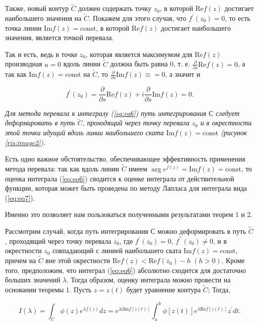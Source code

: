 \documentclass[14pt, a4paper]{article}
\numberwithin{figure}{section}
\numberwithin{equation}{section}
\renewcommand{\Re}{\mathrm{Re}}
\renewcommand{\Im}{\mathrm{Im}}
\newcommand{\const}{\mathrm{const}}
\begin{document}
Также, новый контур $\widetilde{C}$ должен содержать точку $z_0$, в которой $\Re f(z)$ достигает наибольшего значения на $\widetilde{C}$. Покажем для этого случая, что $f^\prime (z_0) = 0$, то есть точка линии $\Im f(z) = \const$, в которой $\Re f (z)$ достигает наибольшего значения, является точкой перевала.

Так и есть, ведь в точке $z_0$, которая является максимумом для $\Re f (z)$ производная $u=0$ вдоль линии $\widetilde{C}$ должна быть равна 0, т. е. $\frac{\partial}{\partial s}\Re f(z)=0$, а так как $\Im f(z) = \const$ на $\widetilde{C}$, то $\frac{\partial}{\partial s} \Im f(z) \equiv = 0$, а значит и 

$$
f^\prime(z_0) = \frac{\partial}{\partial s} \Re f(z) + i\frac{\partial}{\partial s} \Im f(z) = 0.
$$ 

\textit{Для метода перевала к интегралу (\ref{eq:eq6}) путь интегрирования $С$ следует деформировать в путь $\widetilde{C}$, проходящий через точку перевала $z_0$ и в окрестности этой точки идущий вдоль линии наибольшего ската $\Im f(z) = \const$ (рисунок \ref{ris:image2}).}

Есть одно важное обстоятельство, обеспечивающее эффективность применения метода перевала: так как вдоль линии $\widetilde{C}$ имеем $\arg e^{f(z)} = \Im f(z) = \const$, то оценка интеграла (\ref{eq:eq6}) сводится к оценке интеграла от действительной функции, которая может быть проведена по методу Лапласа для интеграла вида (\ref{eq:eq7}).  \cite{Fedoryuk}

Именно это позволяет нам пользоваться полученными результатами теорем 1 и 2. 

Рассмотрим  случай, когда путь интегрирования $С$ можно деформировать в путь $\widetilde{C}$, проходящий через точку перевала $z_0$, где $f^\prime(z_0) = 0$, $f^{\prime\prime}(z_0)\neq0$, и в окрестности $z_0$ совпадающий с линией наибольшего ската $\Im f(z) = \const$, причем на $\widetilde{C}$ вне этой окрестности $\Re f(z) < \Re f(z_0) - h \;(h> 0)$. Кроме того, предположим, что интеграл (\ref{eq:eq6}) абсолютно сходится для достаточно больших значений $\lambda$.
Тогда образом, оценку интеграла можно провести на основании теоремы 1. Пусть $z = z(t)$ будет уравнение контура $\widetilde{C}$; Тогда,

\begin{equation}\label{eq:eq11}
I(\lambda) = \int_{C}^{}\phi(z) e^{\lambda f(z)}dz=e^{\lambda i \Im f[z(t)]}\int_{a}^{b}\phi[z(t)]e^{\lambda \Re f[z(t)]}z^{\prime} dt.
\end{equation}
\end{document}

